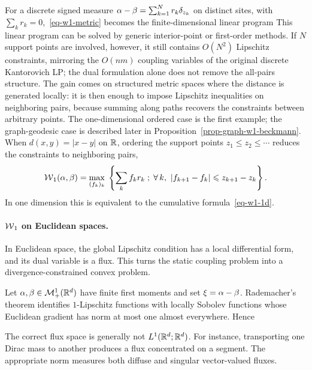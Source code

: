 For a discrete signed measure $\alpha-\beta=\sum_{k=1}^N r_k\delta_{z_k}$ on distinct sites, with $\sum_k r_k=0$,~\eqref{eq-w1-metric} becomes the finite-dimensional linear program
This linear program can be solved by generic interior-point or first-order methods. If $N$ support points are involved, however, it still contains $O(N^2)$ Lipschitz constraints, mirroring the $O(nm)$ coupling variables of the original discrete Kantorovich LP; the dual formulation alone does not remove the all-pairs structure. The gain comes on structured metric spaces where the distance is generated locally: it is then enough to impose Lipschitz inequalities on neighboring pairs, because summing along paths recovers the constraints between arbitrary points. The one-dimensional ordered case is the first example; the graph-geodesic case is described later in Proposition~\ref{prop-graph-w1-beckmann}.
When $d(x,y)=|x-y|$ on $\mathbb{R}$, ordering the support points $z_1\leq z_2\leq\cdots$ reduces the constraints to neighboring pairs,
\[
	\operatorname{\mathcal{W}}_1(\alpha,\beta)
	=
	\underset{(f_k)_k}{\max}\;
	\left\{ \sum_k f_k r_k \;;\; \forall \, k,\ |f_{k+1}-f_k|\leqslant z_{k+1}-z_k \right\}.
\]
In one dimension this is equivalent to the cumulative formula~\eqref{eq-w1-1d}.

\paragraph{$\operatorname{\mathcal{W}}_1$ on Euclidean spaces.}

In Euclidean space, the global Lipschitz condition has a local differential form, and its dual variable is a flux. This turns the static coupling problem into a divergence-constrained convex problem.

Let $\alpha,\beta\in\mathcal{M}_+^1(\mathbb{R}^d)$ have finite first moments and set $\xi=\alpha-\beta$. Rademacher's theorem identifies $1$-Lipschitz functions with locally Sobolev functions whose Euclidean gradient has norm at most one almost everywhere. Hence

The correct flux space is generally not $L^1(\mathbb{R}^d;\mathbb{R}^d)$. For instance, transporting one Dirac mass to another produces a flux concentrated on a segment. The appropriate norm measures both diffuse and singular vector-valued fluxes.

